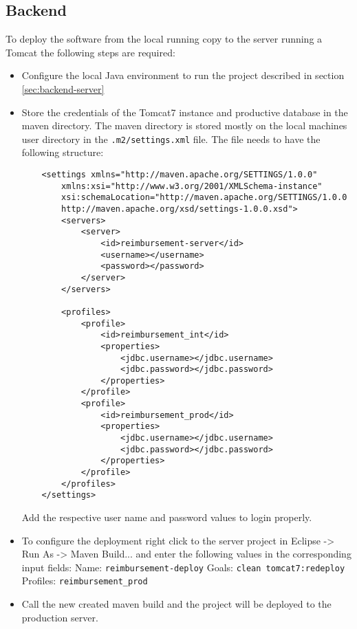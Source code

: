 \subsection{Backend}

To deploy the software from the local running copy to the server running a Tomcat the following steps are required:

\begin{itemize}
    \item Configure the local Java environment to run the project described in section \ref{sec:backend-server} 
    \item Store the credentials of the Tomcat7 instance and productive database in the maven directory. The maven directory is stored mostly on the local machines user directory in the \texttt{.m2/settings.xml} file. The file needs to have the following structure:

    \begin{lstlisting}
    <settings xmlns="http://maven.apache.org/SETTINGS/1.0.0"
        xmlns:xsi="http://www.w3.org/2001/XMLSchema-instance"
        xsi:schemaLocation="http://maven.apache.org/SETTINGS/1.0.0
        http://maven.apache.org/xsd/settings-1.0.0.xsd">
    	<servers>
    		<server>
    			<id>reimbursement-server</id>
    			<username></username>
    			<password></password>
    		</server>
    	</servers>
    
    	<profiles>
    		<profile>
    			<id>reimbursement_int</id>
    			<properties>
    				<jdbc.username></jdbc.username>
    				<jdbc.password></jdbc.password>
    			</properties>
    		</profile>
    		<profile>
    			<id>reimbursement_prod</id>
    			<properties>
    				<jdbc.username></jdbc.username>
    				<jdbc.password></jdbc.password>
    			</properties>
    		</profile>
    	</profiles>
    </settings>
    \end{lstlisting}
    
    Add the respective user name and password values to login properly.
    
    \item To configure the deployment right click to the server project in Eclipse -> Run As -> Maven Build... and enter the following values in the corresponding input fields:
    \newline
    Name: \texttt{reimbursement-deploy}
    \newline
    Goals: \texttt{clean tomcat7:redeploy}
    \newline
    Profiles: \texttt{reimbursement\_prod}
    \item Call the new created maven build and the project will be deployed to the production server.  
    
\end{itemize}
    
